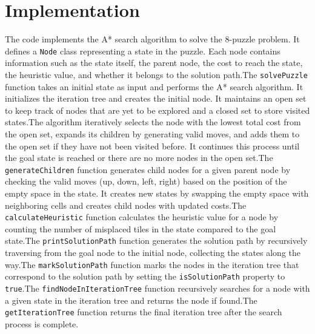 \documentclass[12pt]{report}
\begin{document}
\section{Implementation}
    The code implements the A* search algorithm to solve the 8-puzzle problem. It defines a \texttt{Node} class representing a state in the puzzle. Each node contains information such as the state itself, the parent node, the cost to reach the state, the heuristic value, and whether it belongs to the solution path.\newline \newline The \texttt{solvePuzzle} function takes an initial state as input and performs the A* search algorithm. It initializes the iteration tree and creates the initial node. It maintains an open set to keep track of nodes that are yet to be explored and a closed set to store visited states.\newline \newline The algorithm iteratively selects the node with the lowest total cost from the open set, expands its children by generating valid moves, and adds them to the open set if they have not been visited before. It continues this process until the goal state is reached or there are no more nodes in the open set.\newline \newline The \texttt{generateChildren} function generates child nodes for a given parent node by checking the valid moves (up, down, left, right) based on the position of the empty space in the state. It creates new states by swapping the empty space with neighboring cells and creates child nodes with updated costs.\newline \newline The \texttt{calculateHeuristic} function calculates the heuristic value for a node by counting the number of misplaced tiles in the state compared to the goal state.\newline \newline The \texttt{printSolutionPath} function generates the solution path by recursively traversing from the goal node to the initial node, collecting the states along the way.\newline \newline The \texttt{markSolutionPath} function marks the nodes in the iteration tree that correspond to the solution path by setting the \texttt{isSolutionPath} property to \texttt{true}.\newline \newline The \texttt{findNodeInIterationTree} function recursively searches for a node with a given state in the iteration tree and returns the node if found.\newline \newline The \texttt{getIterationTree} function returns the final iteration tree after the search process is complete.
\end{document}
